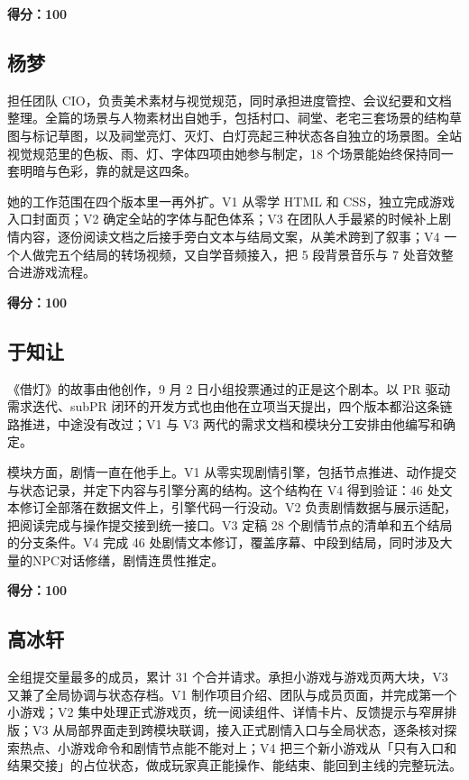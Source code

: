 \medskip
\noindent\textbf{得分：100}

\subsection{杨梦}

担任团队 CIO，负责美术素材与视觉规范，同时承担进度管控、会议纪要和文档整理。全篇的场景与人物素材出自她手，包括村口、祠堂、老宅三套场景的结构草图与标记草图，以及祠堂亮灯、灭灯、白灯亮起三种状态各自独立的场景图。全站视觉规范里的色板、雨、灯、字体四项由她参与制定，18 个场景能始终保持同一套明暗与色彩，靠的就是这四条。

她的工作范围在四个版本里一再外扩。V1 从零学 HTML 和 CSS，独立完成游戏入口封面页；V2 确定全站的字体与配色体系；V3 在团队人手最紧的时候补上剧情内容，逐份阅读文档之后接手旁白文本与结局文案，从美术跨到了叙事；V4 一个人做完五个结局的转场视频，又自学音频接入，把 5 段背景音乐与 7 处音效整合进游戏流程。

\medskip
\noindent\textbf{得分：100}

\subsection{于知让}

《借灯》的故事由他创作，9 月 2 日小组投票通过的正是这个剧本。以 PR 驱动需求迭代、subPR 闭环的开发方式也由他在立项当天提出，四个版本都沿这条链路推进，中途没有改过；V1 与 V3 两代的需求文档和模块分工安排由他编写和确定。

模块方面，剧情一直在他手上。V1 从零实现剧情引擎，包括节点推进、动作提交与状态记录，并定下内容与引擎分离的结构。这个结构在 V4 得到验证：46 处文本修订全部落在数据文件上，引擎代码一行没动。V2 负责剧情数据与展示适配，把阅读完成与操作提交接到统一接口。V3 定稿 28 个剧情节点的清单和五个结局的分支条件。V4 完成 46 处剧情文本修订，覆盖序幕、中段到结局，同时涉及大量的NPC对话修缮，剧情连贯性推定。

\medskip
\noindent\textbf{得分：100}

\subsection{高冰轩}

全组提交量最多的成员，累计 31 个合并请求。承担小游戏与游戏页两大块，V3 又兼了全局协调与状态存档。V1 制作项目介绍、团队与成员页面，并完成第一个小游戏；V2 集中处理正式游戏页，统一阅读组件、详情卡片、反馈提示与窄屏排版；V3 从局部界面走到跨模块联调，接入正式剧情入口与全局状态，逐条核对探索热点、小游戏命令和剧情节点能不能对上；V4 把三个新小游戏从「只有入口和结果交接」的占位状态，做成玩家真正能操作、能结束、能回到主线的完整玩法。


